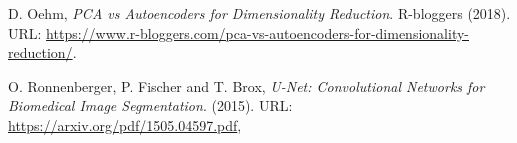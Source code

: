 \begin{thebibliography}{3}
D. Oehm,
\emph{PCA vs Autoencoders for Dimensionality Reduction}.
R-bloggers
(2018).
URL: \url{https://www.r-bloggers.com/pca-vs-autoencoders-for-dimensionality-reduction/}.








O. Ronnenberger, P. Fischer and T. Brox,
\emph{U-Net: Convolutional Networks for Biomedical Image Segmentation}.
(2015).
URL: \url{https://arxiv.org/pdf/1505.04597.pdf},




\end{thebibliography}
\nonfrenchspacing
